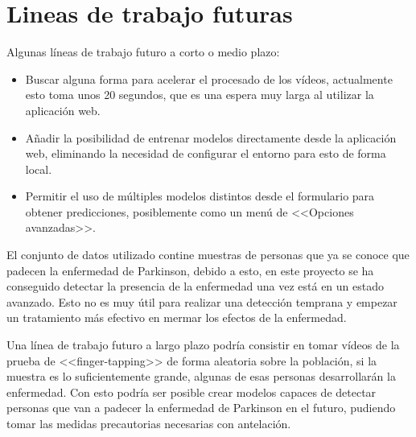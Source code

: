 \section{Lineas de trabajo futuras}

Algunas líneas de trabajo futuro a corto o medio plazo:

\begin{itemize}
    \item Buscar alguna forma para acelerar el procesado de los vídeos,
    actualmente esto toma unos 20 segundos, que es una espera muy larga al
    utilizar la aplicación web.
    \item Añadir la posibilidad de entrenar modelos directamente desde la
    aplicación web, eliminando la necesidad de configurar el entorno para esto
    de forma local.
    \item Permitir el uso de múltiples modelos distintos desde el formulario
    para obtener predicciones, posiblemente como un menú de <<Opciones
    avanzadas>>.
\end{itemize}

El conjunto de datos utilizado contine muestras de personas que ya se conoce que
padecen la enfermedad de Parkinson, debido a esto, en este proyecto se ha
conseguido detectar la presencia de la enfermedad una vez está en un estado
avanzado. Esto no es muy útil para realizar una detección temprana y empezar un
tratamiento más efectivo en mermar los efectos de la enfermedad.

Una línea de trabajo futuro a largo plazo podría consistir en tomar vídeos de la
prueba de <<finger-tapping>> de forma aleatoria sobre la población, si la
muestra es lo suficientemente grande, algunas de esas personas desarrollarán la
enfermedad. Con esto podría ser posible crear modelos capaces de detectar
personas que van a padecer la enfermedad de Parkinson en el futuro, pudiendo
tomar las medidas precautorias necesarias con antelación.
